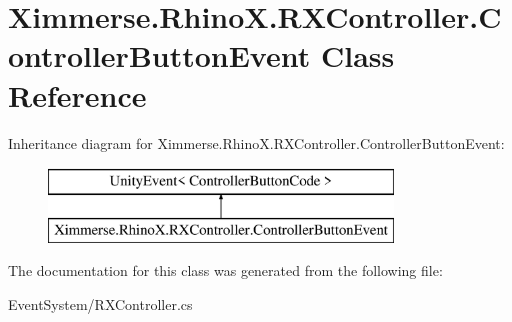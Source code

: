 \hypertarget{class_ximmerse_1_1_rhino_x_1_1_r_x_controller_1_1_controller_button_event}{}\section{Ximmerse.\+Rhino\+X.\+R\+X\+Controller.\+Controller\+Button\+Event Class Reference}
\label{class_ximmerse_1_1_rhino_x_1_1_r_x_controller_1_1_controller_button_event}
Inheritance diagram for Ximmerse.\+Rhino\+X.\+R\+X\+Controller.\+Controller\+Button\+Event\+:\begin{figure}[H]
\begin{center}
\leavevmode
\includegraphics[height=2.000000cm]{class_ximmerse_1_1_rhino_x_1_1_r_x_controller_1_1_controller_button_event}
\end{center}
\end{figure}


The documentation for this class was generated from the following file\+:\begin{DoxyCompactItemize}
\item 
Event\+System/R\+X\+Controller.\+cs\end{DoxyCompactItemize}
